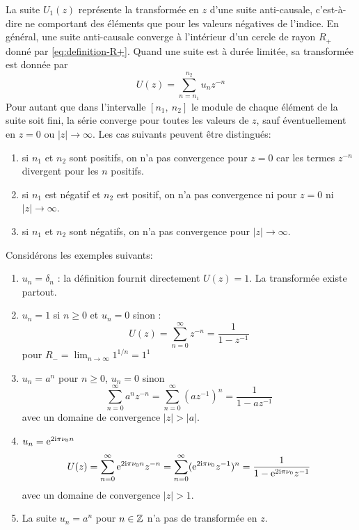 La suite $U_{1}(z)$ repr\'{e}sente la transform\'{e}e en $z$ d'une suite anti-causale, c'est-\`{a}-dire ne comportant des \'{e}l\'{e}ments que pour les valeurs n\'{e}gatives de l'indice. En g\'{e}n\'{e}ral, une suite anti-causale converge \`{a} l'int\'{e}rieur d'un cercle de rayon $R_+$donn\'{e} par \eqref{eq:definition-R+}. Quand une suite est \`{a} dur\'{e}e limit\'{e}e, sa transform\'{e}e est donn\'{e}e par
\begin{equation}
\label{eq:z-duree-limitee}
U(z)=\sum_{n=n_{1}}^{n_{2}} u_n z^{-n}
\end{equation}
Pour autant que dans l'intervalle $[n_{1},\ n_{2}]$ le module de chaque \'{e}l\'{e}ment de la suite soit fini, la s\'{e}rie converge pour toutes les valeurs de $z$, sauf \'{e}ventuellement en $z=0$ ou $|z|\rightarrow\infty$. Les cas suivants peuvent \^{e}tre distingu\'{e}s:
\begin{enumerate}
\item si $n_{1}$ et $n_{2}$ sont positifs, on n'a pas convergence pour $z=0$ car les termes $z^{-n}$ divergent pour les $n$ positifs.
\item  si $n_{1}$ est n\'{e}gatif et $n_{2}$ est positif, on n'a pas convergence ni pour $z=0$ ni $|z|\rightarrow\infty$.
\item si $n_{1}$ et $n_{2}$ sont n\'{e}gatifs, on n'a pas convergence pour $|z|\rightarrow\infty$.
\end{enumerate}
Consid\'{e}rons les exemples suivants:
\begin{enumerate}
\item $u_n=\delta_n$ : la d\'{e}finition fournit directement $U(z)=1$. La transform\'{e}e existe partout.
\item $u_n=1$ si $n \geq 0$ et $u_n=0$ sinon :
$$
U(z)=\sum_{n=0}^{\infty}z^{-n}=\frac{1}{1-z^{-1}}
$$
pour $R_{-}=\displaystyle \lim_{n\rightarrow\infty}1^{1/n}=1^{1}$
\item $u_n=a^{n}$ pour $n \geq 0$, $u_n=0$ sinon
\begin{equation}
\label{eq:z-exponentiel}
\sum_{n=0}^{\infty}a^{n}z^{-n}=\sum_{n=0}^{\infty}(az^{-1})^{n}=\frac{1}{1-az^{-1}}
\end{equation}
avec un domaine de convergence $|z|>|a|$.
\item $u_n = \mathrm{e}^{ 2 \mathrm{i} \pi \nu_0 n}$
$$
U(z)=\sum_{n=0}^{\infty}\mathrm{e}^{2 \mathrm{i} \pi \nu_0 n}z^{-n}=\sum_{n=0}^{\infty}( \mathrm{e}^{2 \mathrm{i} \pi \nu_0} z^{-1})^{n}=\frac{1}{1- \mathrm{e}^{2 \mathrm{i} \pi \nu_0} z^{-1}}
$$
avec un domaine de convergence $|z|>1$.
\item La suite $u_n= a^n$ pour $n \in \mathbb{Z}$ n'a pas de transformée en $z$.
\end{enumerate}
